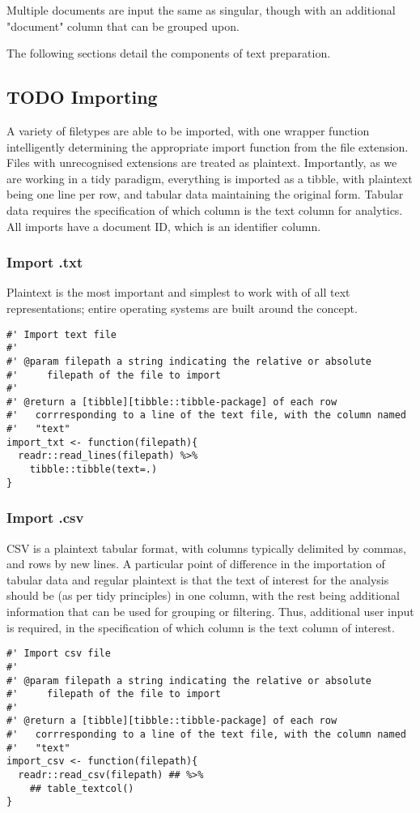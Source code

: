 \documentclass[a4paper, 11pt]{article}
\begin{document}
Multiple documents are input the same as singular, though with an
additional "document" column that can be grouped upon.

The following sections detail the components of text preparation.
\subsection{{\bfseries\sffamily TODO} Importing}
\label{sec:orge3d215e}
A variety of filetypes are able to be imported, with one wrapper
function intelligently determining the appropriate import function
from the file extension. Files with unrecognised extensions are
treated as plaintext. Importantly, as we are working in a tidy
paradigm, everything is imported as a tibble, with plaintext being one
line per row, and tabular data maintaining the original form. Tabular
data requires the specification of which column is the text column for
analytics. All imports have a document ID, which is an identifier column.
\subsubsection{Import .txt}
\label{sec:orgd86069c}
Plaintext is the most important and simplest to work with of all text
representations; entire operating systems are built around the
concept. 
\begin{verbatim}
#' Import text file 
#'
#' @param filepath a string indicating the relative or absolute
#'     filepath of the file to import
#' 
#' @return a [tibble][tibble::tibble-package] of each row
#'   corrresponding to a line of the text file, with the column named
#'   "text"
import_txt <- function(filepath){
  readr::read_lines(filepath) %>%
    tibble::tibble(text=.)
}
\end{verbatim}
\subsubsection{Import .csv}
\label{sec:org3b66107}
CSV is a plaintext tabular format, with columns typically delimited by
commas, and rows by new lines. A particular point of difference in the
importation of tabular data and regular plaintext is that the text of
interest for the analysis should be (as per tidy principles) in one
column, with the rest being additional information that can be used
for grouping or filtering. Thus, additional user input is required, in
the specification of which column is the text column of interest.
\begin{verbatim}
#' Import csv file
#'
#' @param filepath a string indicating the relative or absolute
#'     filepath of the file to import
#'
#' @return a [tibble][tibble::tibble-package] of each row
#'   corrresponding to a line of the text file, with the column named
#'   "text"
import_csv <- function(filepath){
  readr::read_csv(filepath) ## %>%
    ## table_textcol()
}
\end{verbatim}
\end{document}
